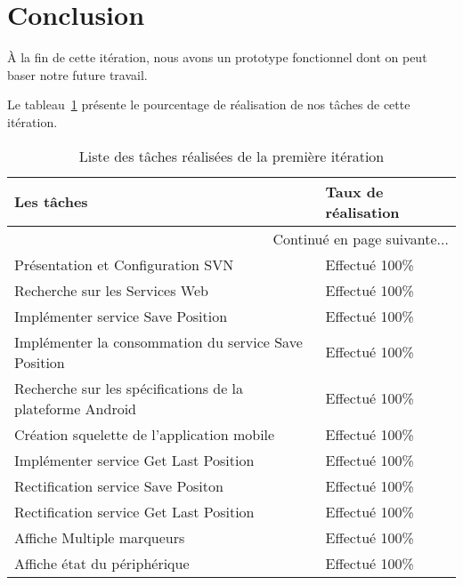 \section*{Conclusion}

À la fin de cette itération, nous avons un prototype fonctionnel
dont on peut baser notre future travail.

Le tableau~\ref{tab:sprint1-evaluation} présente le pourcentage de
réalisation de nos tâches de cette itération.

\begin{center}
    \begin{longtable}{| l | l |}
        \caption{Liste des tâches réalisées de la première itération}
\label{tab:sprint1-evaluation} \\

        \hline
        \textbf{Les tâches} & \textbf{Taux de réalisation} \\ \hline
        \endhead

        \hline \multicolumn{2}{|r|}{{Continué en page suivante$\dotsc$}} \\ \hline
        \endfoot

        \hline \hline
        \endlastfoot

        \hline
Présentation et Configuration SVN & Effectué 100\% \\ \hline
Recherche sur les Services Web & Effectué 100\% \\ \hline
Implémenter service Save Position & Effectué 100\% \\ \hline
Implémenter la consommation du service Save Position & Effectué 100\% \\ \hline
Recherche sur les spécifications de la plateforme Android & Effectué 100\% \\ \hline
Création squelette de l'application mobile & Effectué 100\% \\ \hline
Implémenter service Get Last Position & Effectué 100\% \\ \hline
Rectification service Save Positon & Effectué 100\% \\ \hline
Rectification service Get Last Position & Effectué 100\% \\ \hline
Affiche Multiple marqueurs & Effectué 100\% \\ \hline
Affiche état du périphérique & Effectué 100\% \\ \hline
    \end{longtable}
\end{center}
